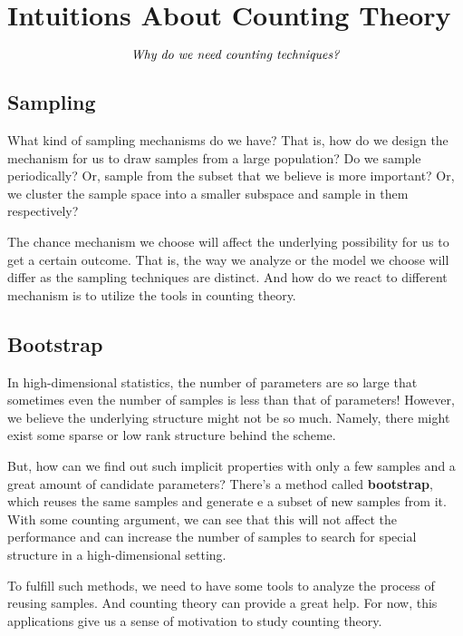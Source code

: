 \documentclass[11pt]{article}
\begin{document}
\section{Intuitions About Counting Theory}
$$\mbox{\it Why do we need counting techniques?}$$
\subsection{Sampling}
What kind of sampling mechanisms do we have? That is, how do we design the mechanism for us to draw samples from a large population? Do we sample periodically? Or, sample from the subset that we believe is more important? Or, we cluster the sample space into a smaller subspace and sample in them respectively?

The chance mechanism we choose will affect the underlying possibility for us to get a certain outcome. That is, the way we analyze or the model we choose will differ as the sampling techniques are distinct. And how do we react to different mechanism is to utilize the tools in counting theory.

\subsection{Bootstrap}
In high-dimensional statistics, the number of parameters are so large that sometimes even the number of samples is less than that of parameters! However, we believe the underlying structure might not be so much. Namely, there might exist some sparse or low rank structure behind the scheme.

But, how can we find out such implicit properties with only a few samples and a great amount of candidate parameters? There's a method called {\bf bootstrap}, which reuses the same samples and generate e a subset of new samples from it. With some counting argument, we can see that this will not affect the performance and can increase the number of samples to search for special structure in a high-dimensional setting.

To fulfill such methods, we need to have some tools to analyze the process of reusing samples. And counting theory can provide a great help. For now, this applications give us a sense of motivation to study counting theory.
\end{document}

